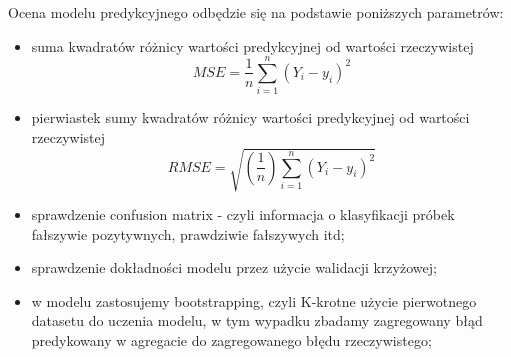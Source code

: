 Ocena modelu predykcyjnego odbędzie się na podstawie poniższych parametrów:
\begin{itemize}
    \item suma kwadratów różnicy wartości predykcyjnej od wartości rzeczywistej
    \begin{equation}
    MSE = {\frac{1}{n}\sum_{i=1}^{n}(Y_{i} - y_{i})^{2}}
    \end{equation}
    \item pierwiastek sumy kwadratów różnicy wartości predykcyjnej od wartości rzeczywistej
    \begin{equation}
    RMSE = \sqrt{(\frac{1}{n})\sum_{i=1}^{n}(Y_{i} - y_{i})^{2}}
    \end{equation}
    \item sprawdzenie confusion matrix - czyli informacja o klasyfikacji próbek fałszywie pozytywnych, prawdziwie fałszywych itd;
    \item sprawdzenie dokładności modelu przez użycie walidacji krzyżowej;
    \item w modelu zastosujemy bootstrapping, czyli K-krotne użycie pierwotnego datasetu do uczenia modelu, w tym wypadku zbadamy zagregowany błąd predykowany w agregacie do zagregowanego błędu rzeczywistego;
\end{itemize}
